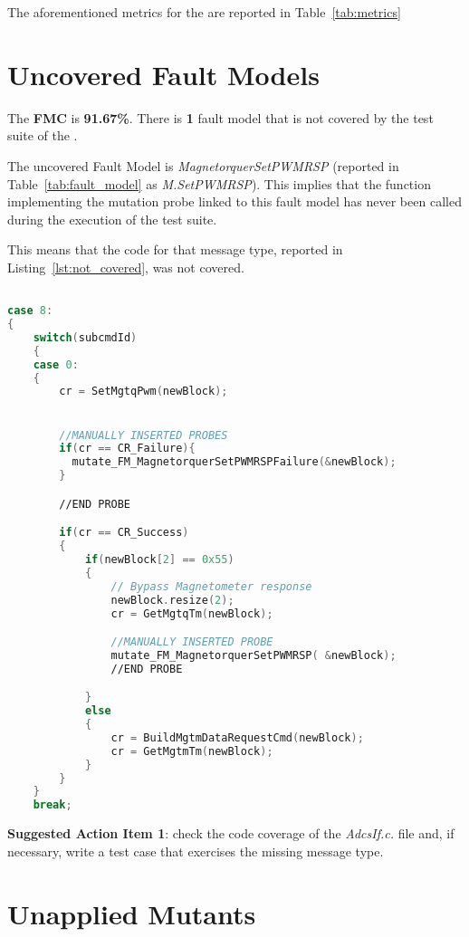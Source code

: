 

The aforementioned metrics for the \case are reported in Table~\ref{tab:metrics}


\section{Uncovered Fault Models}

The \textbf{FMC} is \textbf{91.67\%}. There is \textbf{1} fault model that is not covered by the test suite of the \case.

The uncovered Fault Model is \emph{MagnetorquerSetPWMRSP} (reported in Table~\ref{tab:fault_model} as \emph{M.SetPWMRSP}). This implies that the function implementing the mutation probe linked to this fault model has never been called during the execution of the test suite.

This means that the code for that message type, reported in Listing~\ref{lst:not_covered}, was not covered.


\begin{lstlisting}[language=C++, caption=Uncovered portion of source code, label={lst:not_covered}]

case 8:
{
    switch(subcmdId)
    {
    case 0:
    {
        cr = SetMgtqPwm(newBlock);


        //MANUALLY INSERTED PROBES
        if(cr == CR_Failure){
          mutate_FM_MagnetorquerSetPWMRSPFailure(&newBlock);
        }

        //END PROBE

        if(cr == CR_Success)
        {
            if(newBlock[2] == 0x55)
            {
                // Bypass Magnetometer response
                newBlock.resize(2);
                cr = GetMgtqTm(newBlock);

                //MANUALLY INSERTED PROBE
                mutate_FM_MagnetorquerSetPWMRSP( &newBlock);
                //END PROBE

            }
            else
            {
                cr = BuildMgtmDataRequestCmd(newBlock);
                cr = GetMgtmTm(newBlock);
            }
        }
    }
    break;


\end{lstlisting}

\textbf{Suggested Action Item 1}: check the code coverage of the \emph{AdcsIf.c.} file and, if necessary, write a test case that exercises the missing message type.

\section{Unapplied Mutants}


